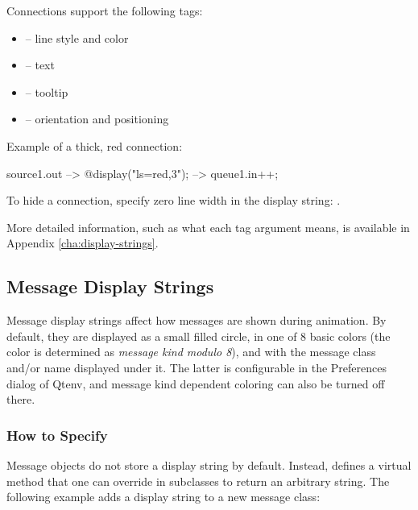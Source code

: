 Connections support the following tags:

\begin{itemize}
  \item {} -- line style and color
  \item {} -- text
  \item {} -- tooltip
  \item {} -- orientation and positioning
\end{itemize}

Example of a thick, red connection:
\begin{ned}
source1.out --> { @display("ls=red,3"); } --> queue1.in++;
\end{ned}

\begin{center}
\end{center}

\begin{note}
To hide a connection, specify zero line width in the display string:
.
\end{note}

More detailed information, such as what each tag argument means, is
available in Appendix \ref{cha:display-strings}.


\subsection{Message Display Strings}
\label{sec:graphics:message-displaystrings}

Message display strings affect how messages are shown during animation.
By default, they are displayed as a small filled circle, in one of
8 basic colors (the color is determined as \textit{message kind modulo 8}),
and with the message class and/or name displayed under it.
The latter is configurable in the Preferences dialog of Qtenv,
and message kind dependent coloring can also be turned off there.

\subsubsection{How to Specify}
\label{sec:graphics:specifying-message-displaystrings}

Message objects do not store a display string by default. Instead,
 defines a virtual  method
that one can override in subclasses to return an arbitrary string.
The following example adds a display string to a new message class:

